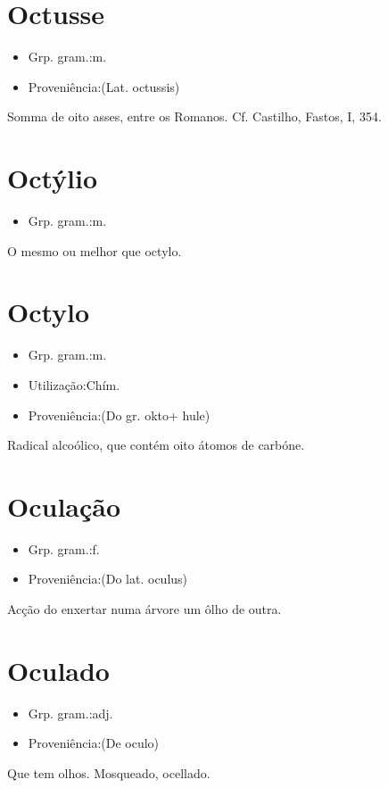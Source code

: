 \section{Octusse}
\begin{itemize}
\item {Grp. gram.:m.}
\end{itemize}
\begin{itemize}
\item {Proveniência:(Lat. \textunderscore octussis\textunderscore )}
\end{itemize}
Somma de oito asses, entre os Romanos. Cf. Castilho, \textunderscore Fastos\textunderscore , I, 354.
\section{Octýlio}
\begin{itemize}
\item {Grp. gram.:m.}
\end{itemize}
O mesmo ou melhor que \textunderscore octylo\textunderscore .
\section{Octylo}
\begin{itemize}
\item {Grp. gram.:m.}
\end{itemize}
\begin{itemize}
\item {Utilização:Chím.}
\end{itemize}
\begin{itemize}
\item {Proveniência:(Do gr. \textunderscore okto\textunderscore  + \textunderscore hule\textunderscore )}
\end{itemize}
Radical alcoólico, que contém oito átomos de carbóne.
\section{Oculação}
\begin{itemize}
\item {Grp. gram.:f.}
\end{itemize}
\begin{itemize}
\item {Proveniência:(Do lat. \textunderscore oculus\textunderscore )}
\end{itemize}
Acção do enxertar numa árvore um ôlho de outra.
\section{Oculado}
\begin{itemize}
\item {Grp. gram.:adj.}
\end{itemize}
\begin{itemize}
\item {Proveniência:(De \textunderscore oculo\textunderscore )}
\end{itemize}
Que tem olhos.
Mosqueado, ocellado.
